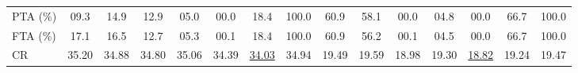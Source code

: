 \begin{table}[p]
\begin{adjustbox}{width=\textwidth,max totalheight=.86\textheight}
\begin{tabular}{l|ccccccc|ccccccc}
PTA (\%) & 09.3 & 14.9 & 12.9 & 05.0 & 00.0 & 18.4 & \cellcolor{lightgray}100.0 & 60.9 & 58.1 & 00.0 & 04.8 & 00.0 & 66.7 & \cellcolor{lightgray}100.0 \\
FTA (\%) & 17.1 & 16.5 & 12.7 & 05.3 & 00.1 & 18.4 & \cellcolor{lightgray}100.0 & 60.9 & 56.2 & 00.1 & 04.5 & 00.0 & 66.7 & \cellcolor{lightgray}100.0 \\
CR & \cellcolor{lightgray}35.20 & 34.88 & 34.80 & 35.06 & 34.39 & \underline{34.03} & 34.94 & 19.49 & \cellcolor{lightgray}19.59 & 18.98 & 19.30 & \underline{18.82} & 19.24 & 19.47 \\
\bottomrule
\end{tabular}
\end{adjustbox}
\end{table}
